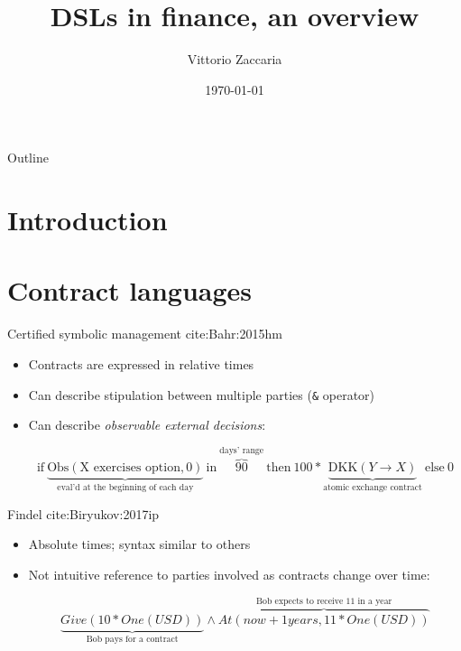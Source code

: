 \documentclass[aspectratio=169]{beamer}
\author{Vittorio Zaccaria}
\date{\today}
\title{DSLs in finance, an overview}
\newcommand{\describe}[2]{\underbrace{#1}_{\text{#2}}}
\newcommand{\describeu}[2]{\overbrace{#1}^{\text{#2}}}
\newcommand{\assetexchange}[3]{\text{#1}(#2 \rightarrow #3)}
\newcommand{\observe}[2]{\text{Obs}(#1,#2)}
\newcommand{\event}[1]{\text{#1}}
\newcommand{\ite}[4]{\text{if}~{#1}~\text{in}~{#2}~\text{then}~{#3}~\text{else}~#4}
\begin{document}
\maketitle
\begin{frame}{Outline}
\tableofcontents
\end{frame}




\section{Introduction}
\label{sec:org534f48b}
\section{Contract languages}
\label{sec:org8a6ae0e}
\begin{frame}[fragile,label={sec:org1d2902f}]{Certified symbolic management cite:Bahr:2015hm}
 \begin{itemize}
\item Contracts are expressed in relative times

\item Can describe stipulation between multiple parties (\texttt{\&} operator)

\item Can describe \emph{observable external decisions}:

$$\ite{\describe{\observe{\event{X exercises option}}{0}}{eval'd at the beginning of each day}}{\describeu{90}{days' range}}{100*\describe{\assetexchange{DKK}{Y}{X}}{atomic exchange contract}}{0}$$
\end{itemize}
\end{frame}

\begin{frame}[label={sec:org524bdb6}]{Findel cite:Biryukov:2017ip}
\begin{itemize}
\item Absolute times; syntax similar to others

\item Not intuitive reference to parties involved as contracts change over time:

$$\describe{Give(10 * One(USD))}{Bob pays for a contract} \wedge \describeu{At(now+1 years, 11 * One(USD))}{Bob expects to receive 11 in a year}$$
\end{itemize}
\end{frame}
\end{document}
